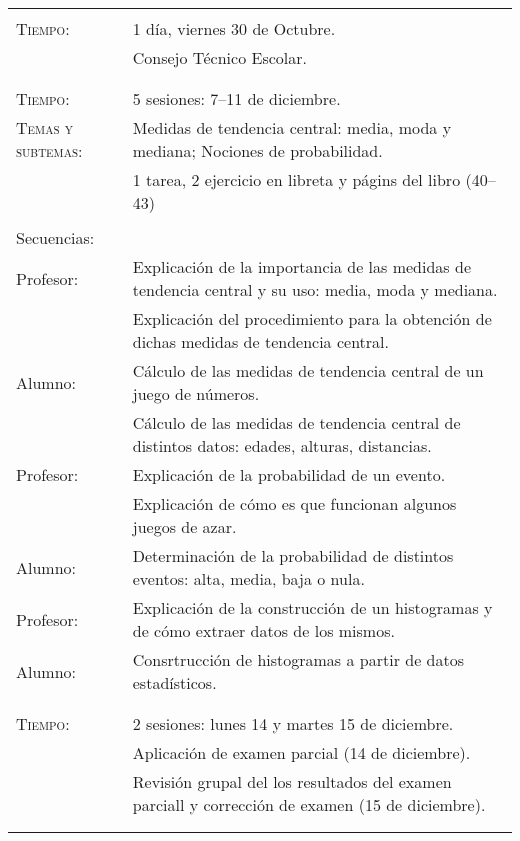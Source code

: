 \documentclass[letterpaper,10pt]{article}
\begin{document}
\begin{tabular}[t]{R{0.25\textwidth}p{0.71\textwidth}}
\\ \hline \\
    \textsc{Tiempo:}& 1 d\'ia, viernes 30 de Octubre. \\
                    & {\Large \sc Consejo T\'ecnico Escolar.} \\ 
\\ \hline \\
    \textsc{Tiempo:}                    & 5 sesiones: 7--11 de diciembre. \\
    \textsc{Temas y subtemas:}          & Medidas de tendencia central: media, moda y mediana; Nociones de probabilidad.\\
              & 1 tarea, 2 ejercicio en libreta y p\'agins del libro (40--43) \\ \\
    \large{\sc Secuencias:} \\
    Profesor:   & Explicaci\'on de la importancia de las medidas de tendencia central y su uso: media, moda y mediana. \\
                & Explicaci\'on del procedimiento para la obtenci\'on de dichas medidas de tendencia central. \\
    Alumno:     & C\'alculo de las medidas de tendencia central de un juego de n\'umeros.  \\
                & C\'alculo de las medidas de tendencia central de distintos datos: edades, alturas, distancias. \\
    Profesor:   & Explicaci\'on de la probabilidad de un evento. \\
                & Explicaci\'on de c\'omo es que funcionan algunos juegos de azar. \\
    Alumno:     & Determinación de la probabilidad de distintos eventos: alta, media, baja o nula. \\
    Profesor:   & Explicaci\'on de la construcci\'on de un histogramas y de c\'omo extraer datos de los mismos. \\
    Alumno:     & Consrtrucci\'on de histogramas a partir de datos estad\'isticos.\\
\\ \hline \\
 
    \textsc{Tiempo:}& 2 sesiones: lunes 14 y martes 15  de diciembre. \\
                    & {\Large \sc Aplicaci\'on de examen parcial} (14 de diciembre). \\ 
                    & Revisi\'on grupal del los resultados del examen parciall y correcci\'on de examen (15 de diciembre).\\
\\ \hline \\

\end{tabular}
\end{document}
